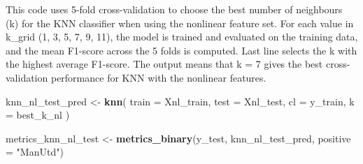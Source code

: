 \documentclass[
]{article}
\newenvironment{Shaded}{\begin{snugshade}}{\end{snugshade}}
\newcommand{\AttributeTok}[1]{\textcolor[rgb]{0.13,0.29,0.53}{#1}}
\newcommand{\FunctionTok}[1]{\textcolor[rgb]{0.13,0.29,0.53}{\textbf{#1}}}
\newcommand{\NormalTok}[1]{#1}
\newcommand{\OtherTok}[1]{\textcolor[rgb]{0.56,0.35,0.01}{#1}}
\newcommand{\StringTok}[1]{\textcolor[rgb]{0.31,0.60,0.02}{#1}}
\begin{document}
This code uses 5-fold cross-validation to choose the best number of
neighbours (k) for the KNN classifier when using the nonlinear feature
set. For each value in k\_grid (1, 3, 5, 7, 9, 11), the model is trained
and evaluated on the training data, and the mean F1-score across the 5
folds is computed. Last line selects the k with the highest average
F1-score. The output means that k = 7 gives the best cross-validation
performance for KNN with the nonlinear features.

\begin{Shaded}
\begin{Highlighting}[]
\NormalTok{knn\_nl\_test\_pred }\OtherTok{\textless{}{-}} \FunctionTok{knn}\NormalTok{(}
  \AttributeTok{train =}\NormalTok{ Xnl\_train,}
  \AttributeTok{test  =}\NormalTok{ Xnl\_test,}
  \AttributeTok{cl    =}\NormalTok{ y\_train,}
  \AttributeTok{k     =}\NormalTok{ best\_k\_nl}
\NormalTok{)}

\NormalTok{metrics\_knn\_nl\_test }\OtherTok{\textless{}{-}} \FunctionTok{metrics\_binary}\NormalTok{(y\_test, knn\_nl\_test\_pred, }\AttributeTok{positive =} \StringTok{"ManUtd"}\NormalTok{)}
\end{Highlighting}
\end{Shaded}
\end{document}
